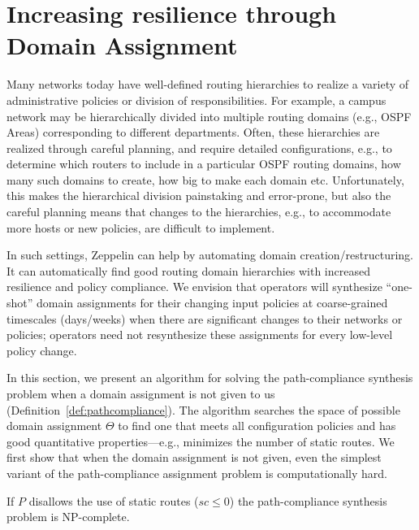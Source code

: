 \section{Increasing resilience through Domain Assignment}
\label{sec:synth-dom-ass}
Many networks today have well-defined routing hierarchies to realize a variety of administrative  policies or division of responsibilities. For example, a campus network may be hierarchically divided into multiple routing domains (e.g., OSPF Areas) corresponding to different departments. Often, these hierarchies are realized through careful planning, and require detailed configurations, e.g., to determine which routers to include in a particular OSPF routing domains, how many such domains to create, how big to make each domain etc. Unfortunately, this makes the hierarchical division painstaking and error-prone, but also the careful planning means that changes to the hierarchies, e.g., to accommodate more hosts or new policies, are difficult to implement.

In such settings, Zeppelin can help by automating domain creation/restructuring. It can automatically find good routing domain hierarchies with increased resilience and policy compliance. We envision that operators will synthesize “one-shot” domain assignments for their changing input policies at coarse-grained timescales (days/weeks) when there are significant changes to their networks or policies; operators need not resynthesize these assignments for every low-level policy change.


In this section, we present an algorithm for 
solving the path-compliance synthesis problem when a domain assignment is not given to us (Definition~\ref{def:pathcompliance}).
The algorithm searches the space of possible domain assignment $\Theta$ to find
one that meets all configuration policies and has good quantitative properties---e.g., minimizes
the number of static routes. 
%
We first show that when the domain assignment is not given,
even the simplest variant of the path-compliance assignment problem
is computationally hard.
\begin{theorem}
If $P$ disallows the use of static routes ($sc \leq 0$)
the path-compliance synthesis problem is NP-complete.
\end{theorem}
\iffull

\fi


